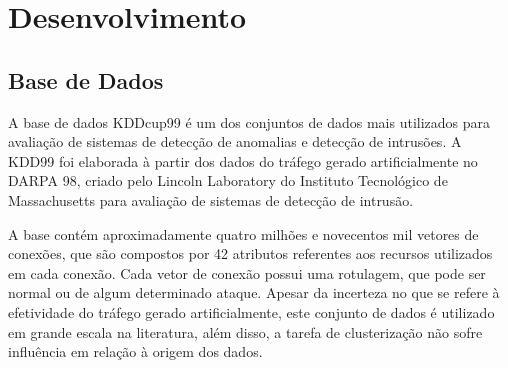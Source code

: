 \chapter{Desenvolvimento}

  \section{Base de Dados}

\indent A base de dados KDDcup99 \cite{kdd99} é um dos conjuntos de dados mais utilizados para avaliação de sistemas de detecção de anomalias e detecção de intrusões. A KDD99 foi elaborada à partir dos dados do tráfego gerado artificialmente no DARPA 98, criado pelo Lincoln Laboratory do Instituto Tecnológico de Massachusetts para avaliação de sistemas de detecção de intrusão.

\indent A base contém aproximadamente quatro milhões e novecentos mil vetores de conexões, que são compostos por 42 atributos referentes aos recursos utilizados em cada conexão. Cada vetor de conexão possui uma rotulagem, que pode ser normal ou de algum determinado ataque. Apesar da incerteza no que se refere à efetividade do tráfego gerado artificialmente, este conjunto de dados é utilizado em grande escala na literatura, além disso, a tarefa de clusterização não sofre influência em relação à origem dos dados.

